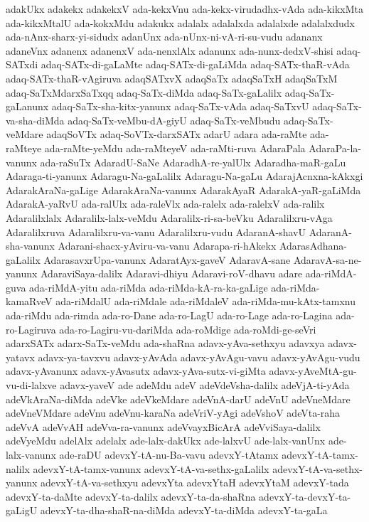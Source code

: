 {adakUkx
adakekx
adakekxV
ada-kekxVnu
ada-kekx-virudadhx-vAda
ada-kikxMta
ada-kikxMtalU
ada-kokxMdu
adakukx
adalalx
adalalxda
adalalxde
adalalxdudx
ada-nAnx-sharx-yi-sidudx
adanUnx
ada-nUnx-ni-vA-ri-su-vudu
adananx
adaneVnx
adanenx
adanenxV
ada-nenxlAlx
adanunx
ada-nunx-dedxV-shisi
adaq-SATxdi
adaq-SATx-di-gaLaMte
adaq-SATx-di-gaLiMda
adaq-SATx-thaR-vAda
adaq-SATx-thaR-vAgiruva
adaqSATxvX
adaqSaTx
adaqSaTxH
adaqSaTxM
adaq-SaTxMdarxSaTxqq
adaq-SaTx-diMda
adaq-SaTx-gaLalilx
adaq-SaTx-gaLanunx
adaq-SaTx-sha-kitx-yanunx
adaq-SaTx-vAda
adaq-SaTxvU
adaq-SaTx-va-sha-diMda
adaq-SaTx-veMbu-dA-giyU
adaq-SaTx-veMbudu
adaq-SaTx-veMdare
adaqSoVTx
adaq-SoVTx-darxSATx
adarU
adara
ada-raMte
ada-raMteye
ada-raMte-yeMdu
ada-raMteyeV
ada-raMti-ruva
AdaraPala
AdaraPa-la-vanunx
ada-raSuTx
AdaradU-SaNe
AdaradhA-re-yalUlx
Adaradha-maR-gaLu
Adaraga-ti-yanunx
Adaragu-Na-gaLalilx
Adaragu-Na-gaLu
AdarajAcnxna-kAkxgi
AdarakAraNa-gaLige
AdarakAraNa-vanunx
AdarakAyaR
AdarakA-yaR-gaLiMda
AdarakA-yaRvU
ada-ralUlx
ada-raleVlx
ada-ralelx
ada-ralelxV
ada-ralilx
Adaralilxlalx
Adaralilx-lalx-veMdu
Adaralilx-ri-sa-beVku
Adaralilxru-vAga
Adaralilxruva
Adaralilxru-va-vanu
Adaralilxru-vudu
AdaranA-shavU
AdaranA-sha-vanunx
Adarani-shacx-yAviru-va-vanu
Adarapa-ri-hAkekx
AdarasAdhana-gaLalilx
AdarasavxrUpa-vanunx
AdaratAyx-gaveV
AdaravA-sane
AdaravA-sa-ne-yanunx
AdaraviSaya-dalilx
Adaravi-dhiyu
Adaravi-roV-dhavu
adare
ada-riMdA-guva
ada-riMdA-yitu
ada-riMda
ada-riMda-kA-ra-ka-gaLige
ada-riMda-kamaRveV
ada-riMdalU
ada-riMdale
ada-riMdaleV
ada-riMda-mu-kAtx-tamxnu
ada-riMdu
ada-rimda
ada-ro-Dane
ada-ro-LagU
ada-ro-Lage
ada-ro-Lagina
ada-ro-Lagiruva
ada-ro-Lagiru-vu-dariMda
ada-roMdige
ada-roMdi-ge-seVri
adarxSATx
adarx-SaTx-veMdu
ada-shaRna
adavx-yAva-sethxyu
adavxya
adavx-yatavx
adavx-ya-tavxvu
adavx-yAvAda
adavx-yAvAgu-vavu
adavx-yAvAgu-vudu
adavx-yAvanunx
adavx-yAvasutx
adavx-yAva-sutx-vi-giMta
adavx-yAveMtA-gu-vu-di-lalxve
adavx-yaveV
ade
adeMdu
adeV
adeVdeVsha-dalilx
adeVjA-ti-yAda
adeVkAraNa-diMda
adeVke
adeVkeMdare
adeVnA-darU
adeVnU
adeVneMdare
adeVneVMdare
adeVnu
adeVnu-karaNa
adeVriV-yAgi
adeVshoV
adeVta-raha
adeVvA
adeVvAH
adeVva-ra-vanunx
adeVvayxBicArA
adeVviSaya-dalilx
adeVyeMdu
adelAlx
adelalx
ade-lalx-dakUkx
ade-lalxvU
ade-lalx-vanUnx
ade-lalx-vanunx
ade-raDU
adevxY-tA-nu-Ba-vavu
adevxY-tAtamx
adevxY-tA-tamx-nalilx
adevxY-tA-tamx-vanunx
adevxY-tA-va-sethx-gaLalilx
adevxY-tA-va-sethx-yanunx
adevxY-tA-va-sethxyu
adevxYta
adevxYtaH
adevxYtaM
adevxY-tada
adevxY-ta-daMte
adevxY-ta-dalilx
adevxY-ta-da-shaRna
adevxY-ta-devxY-ta-gaLigU
adevxY-ta-dha-shaR-na-diMda
adevxY-ta-diMda
adevxY-ta-gaLa
}
